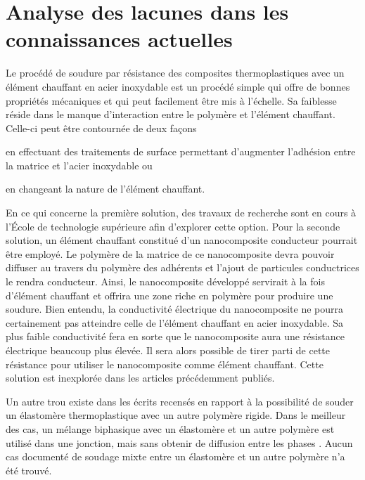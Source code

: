 \label{sec:Objectifs}

\section{Analyse des lacunes dans les connaissances actuelles}

Le procédé de soudure par résistance des composites thermoplastiques avec un élément chauffant en acier inoxydable est un procédé simple qui offre de bonnes propriétés mécaniques et qui peut facilement être mis à l'échelle. 
Sa faiblesse réside dans le manque d'interaction entre le polymère et l'élément chauffant. 
Celle-ci peut être contournée de deux façons \begin{inparaenum}[a)]
	\item en effectuant des traitements de surface permettant d'augmenter l'adhésion entre la matrice et l'acier inoxydable ou 
	\item en changeant la nature de l'élément chauffant. 
\end{inparaenum}
En ce qui concerne la première solution, des travaux de recherche sont en cours à l'École de technologie supérieure afin d'explorer cette option. 
Pour la seconde solution, un élément chauffant constitué d'un nanocomposite conducteur pourrait être employé. 
Le polymère de la matrice de ce nanocomposite devra pouvoir diffuser au travers du polymère des adhérents et l'ajout de particules conductrices le rendra conducteur. 
Ainsi, le nanocomposite développé servirait à la fois d'élément chauffant et offrira une zone riche en polymère pour produire une soudure. 
Bien entendu, la conductivité électrique du nanocomposite ne pourra certainement pas atteindre celle de l'élément chauffant en acier inoxydable. 
Sa plus faible conductivité fera en sorte que le nanocomposite aura une résistance électrique beaucoup plus élevée. 
Il sera alors possible de tirer parti de cette résistance pour utiliser le nanocomposite comme élément chauffant. 
Cette solution est inexplorée dans les articles précédemment publiés. 

Un autre trou existe dans les écrits recensés en rapport à la possibilité de souder un élastomère thermoplastique avec un autre polymère rigide. 
Dans le meilleur des cas, un mélange biphasique avec un élastomère et un autre polymère est utilisé dans une jonction, mais sans obtenir de diffusion entre les phases \cite{Hollande1998}. 
Aucun cas documenté de soudage mixte entre un élastomère et un autre polymère n'a été trouvé. 

